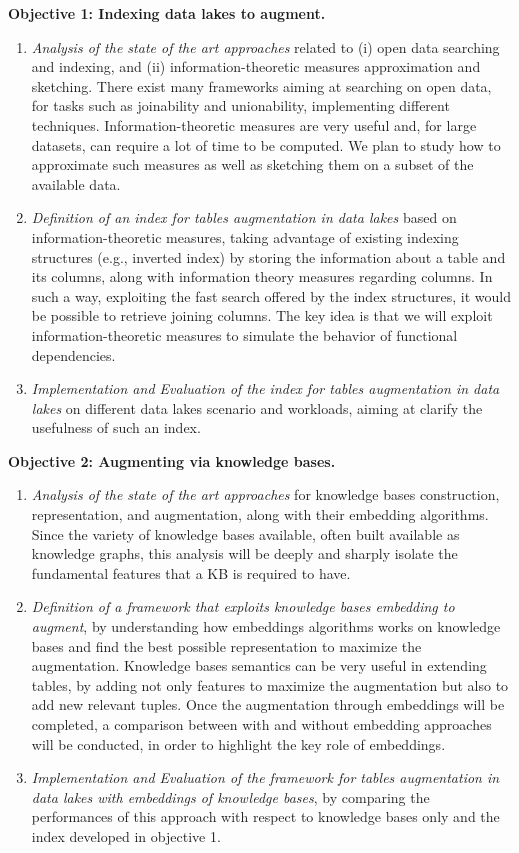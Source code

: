 \bigbreak

\noindent\textbf{Objective 1: Indexing data lakes to augment.}
\begin{enumerate}
    \item \textit{Analysis of the state of the art approaches} related to (i) open data searching and indexing, and (ii) information-theoretic measures approximation and sketching. There exist many frameworks aiming at searching on open data, for tasks such as joinability and unionability, implementing different techniques. Information-theoretic measures are very useful and, for large datasets, can require a lot of time to be computed. We plan to study how to approximate such measures as well as sketching them on a subset of the available data.
    \item \textit{Definition of an index for tables augmentation in data lakes} based on information-theoretic measures, taking advantage of existing indexing structures (e.g., inverted index) by storing the information about a table and its columns, along with information theory measures regarding columns. In such a way, exploiting the fast search offered by the index structures, it would be possible to retrieve joining columns. The key idea is that we will exploit information-theoretic measures to simulate the behavior of functional dependencies. 
    \item \textit{Implementation and Evaluation of the index for tables augmentation in data lakes} on different data lakes scenario and workloads, aiming at clarify the usefulness of such an index.
\end{enumerate}


\noindent\textbf{Objective 2: Augmenting via knowledge bases.}
\begin{enumerate}
    \item \textit{Analysis of the state of the art approaches} for knowledge bases construction, representation, and augmentation, along with their embedding algorithms. Since the variety of knowledge bases available, often built available as knowledge graphs, this analysis will be deeply and sharply isolate the fundamental features that a KB is required to have.
    \item \textit{Definition of a framework that exploits knowledge bases embedding to augment}, by understanding how embeddings algorithms works on knowledge bases and find the best possible representation to maximize the augmentation. Knowledge bases semantics can be very useful in extending tables, by adding not only features to maximize the augmentation but also to add new relevant tuples. Once the augmentation through embeddings will be completed, a comparison between with and without embedding approaches will be conducted, in order to highlight the key role of embeddings.
    \item \textit{Implementation and Evaluation of the framework for tables augmentation in data lakes with embeddings of knowledge bases}, by comparing the performances of this approach with respect to knowledge bases only and the index developed in objective 1.
\end{enumerate}

